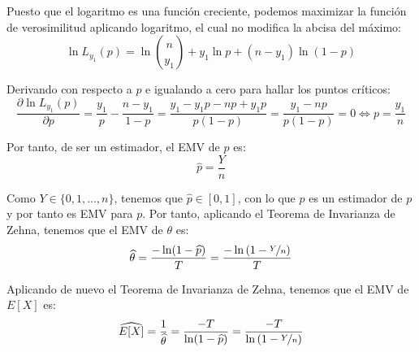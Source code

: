 \begin{ejercicio}
    Puesto que el logaritmo es una función creciente, podemos maximizar la función de verosimilitud aplicando logaritmo, el cual no modifica la abcisa del máximo:
    \begin{equation*}
        \ln L_{y_1}(p) = \ln\binom{n}{y_1} + y_1\ln p + (n-y_1)\ln (1-p)
    \end{equation*}

    Derivando con respecto a $p$ e igualando a cero para hallar los puntos críticos:
    \begin{equation*}
        \dfrac{\partial \ln L_{y_1}(p)}{\partial p} = \frac{y_1}{p} - \frac{n-y_1}{1-p} = \frac{y_1 - y_1p - np + y_1p}{p(1-p)} = \frac{y_1-np}{p(1-p)} = 0 \Longleftrightarrow p = \frac{y_1}{n}
    \end{equation*}

    Por tanto, de ser un estimador, el EMV de $p$ es:
    \begin{equation*}
        \widehat{p} = \frac{Y}{n}
    \end{equation*}

    Como $Y\in \{0,1,\ldots,n\}$, tenemos que $\widehat{p}\in [0,1]$, con lo que $\widehat{p}$ es un estimador de $p$ y por tanto es EMV para $p$. Por tanto, aplicando el Teorema de Invarianza de Zehna, tenemos que el EMV de $\theta$ es:
    \begin{equation*}
        \widehat{\theta} = \frac{-\ln(1-\widehat{p})}{T} = \frac{-\ln\left(1-\nicefrac{Y}{n}\right)}{T}
    \end{equation*}

    Aplicando de nuevo el Teorema de Invarianza de Zehna, tenemos que el EMV de $E[X]$ es:
    \begin{equation*}
        \widehat{E[X]} = \frac{1}{\widehat{\theta}} = \frac{-T}{\ln(1-\widehat{p})} = \frac{-T}{\ln\left(1-\nicefrac{Y}{n}\right)}
    \end{equation*}
\end{ejercicio}

